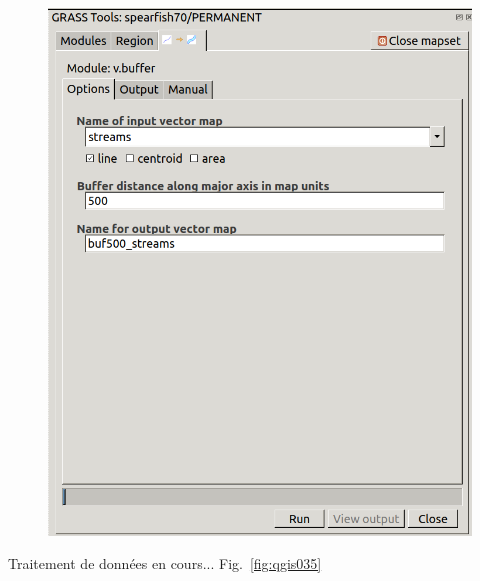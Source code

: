 \begin{figure}[htbp]
   \centering
   \includegraphics[scale=0.25]{qgis034.png}
   \caption{}
   \label{fig:qgis034}
\end{figure}

Traitement de donn\'ees en cours... Fig.~\ref{fig:qgis035}

